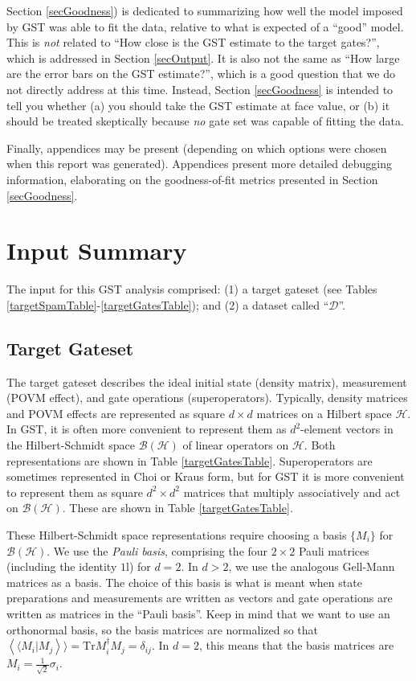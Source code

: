 \documentclass{article}[11pt]
\newcommand{\rrangle}{\rangle\!\rangle} \newcommand{\llangle}{\langle\!\langle}
\newcommand{\sbraket}[2]{\ensuremath{\left\llangle#1|#2\right\rrangle}}
\def\Id{1\!\mathrm{l}}
\newcommand{\Tr}[0]{\mathrm{Tr}}
\begin{document}
Section \ref{secGoodness}) is dedicated to summarizing how well the model imposed by GST was able to fit the data, relative to what is expected of a ``good'' model.  This is \emph{not} related to ``How close is the GST estimate to the target gates?'', which is addressed in Section \ref{secOutput}.  It is also not the same as ``How large are the error bars on the GST estimate?'', which is a good question that we do not directly address at this time.  Instead, Section \ref{secGoodness} is intended to tell you whether (a) you should take the GST estimate at face value, or (b) it should be treated skeptically because \emph{no} gate set was capable of fitting the data.

Finally, appendices may be present (depending on which options were chosen when this report was generated).  Appendices present more detailed debugging information, elaborating on the goodness-of-fit metrics presented in Section \ref{secGoodness}.

\section{Input Summary\label{secInput}}
The input for this GST analysis comprised: (1) a target gateset (see Tables \ref{targetSpamTable}-\ref{targetGatesTable}); and (2) a dataset called ``$\mathcal{D}$''.

\subsection{Target Gateset}

The target gateset describes the ideal initial state (density matrix), measurement (POVM effect), and gate operations (superoperators).  Typically, density matrices and POVM effects are represented as square $d\times d$ matrices on a Hilbert space $\mathcal{H}$.  In GST, it is often more convenient to represent them as $d^2$-element vectors in the Hilbert-Schmidt space $\mathcal{B}(\mathcal{H})$ of linear operators on $\mathcal{H}$.  Both representations are shown in Table \ref{targetGatesTable}.  Superoperators are sometimes represented in Choi or Kraus form, but for GST it is more convenient to represent them as square $d^2\times d^2$ matrices that multiply associatively and act on $\mathcal{B}(\mathcal{H})$.  These are shown in Table \ref{targetGatesTable}.

These Hilbert-Schmidt space representations require choosing a basis $\{M_i\}$ for $\mathcal{B}(\mathcal{H})$.  We use the \emph{Pauli basis}, comprising the four $2\times2$ Pauli matrices (including the identity $\Id$) for $d=2$.  In $d>2$, we use the analogous Gell-Mann matrices as a basis.   The choice of this basis is what is meant when state preparations and measurements are written as vectors and gate operations are written as matrices in the ``Pauli basis''.  Keep in mind that we want to use an orthonormal basis, so the basis matrices are normalized so that $\sbraket{M_i}{M_j} = \Tr M_i^\dagger M_j = \delta_{ij}$.  In $d=2$, this means that the basis matrices are $M_i = \frac{1}{\sqrt{2}}\sigma_i$.
\end{document}
